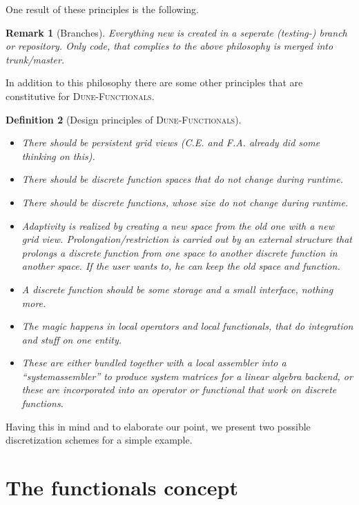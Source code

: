 \documentclass[a4paper,11pt]{article}
\numberwithin{equation}{section}
\newtheorem{definition}{Definition}[section]
\newtheorem{remark}[definition]{Remark}
\newcommand{\theoremEndLine}{\hspace{1mm}}
\newcommand{\theoremItemizeNewline}{\hspace{1mm}\vspace{-3mm}}
\newcommand{\dunefunctionals}{\textsc{Dune-Functionals}\xspace}
\begin{document}
One result of these principles is the following.

\begin{remark}[Branches]
  Everything new is created in a seperate (testing-) branch or repository. Only code, that complies to the above philosophy
  is merged into trunk/master.
\end{remark}

In addition to this philosophy there are some other principles that are constitutive for \dunefunctionals.

\begin{definition}[Design principles of \dunefunctionals]\theoremItemizeNewline
  \begin{itemize}
    \item There should be persistent grid views (C.E. and F.A. already did some thinking on this).
    \item There should be discrete function spaces that do not change during runtime.
    \item There should be discrete functions, whose size do not change during runtime.
    \item Adaptivity is realized by creating a new space from the old one with a new grid view. Prolongation/restriction
    is carried out by an external structure that prolongs a discrete function from one space to another discrete
    function in another space. If the user wants to, he can keep the old space and function.
    \item A discrete function should be some storage and a small interface, nothing more.
    \item The magic happens in local operators and local functionals, that do integration and stuff on one entity.
    \item These are either bundled together with a local assembler into a ``systemassembler'' to produce system matrices
    for a linear algebra backend, or these are incorporated into an operator or functional that work on discrete
    functions.
  \end{itemize}
\end{definition}\theoremEndLine

Having this in mind and to elaborate our point, we present two possible discretization schemes for a simple example.


\section{The functionals concept}
\label{section::the_functionals_concept}
\end{document}
